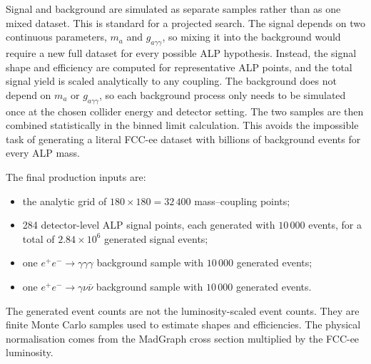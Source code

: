 \documentclass[12pt,a4paper]{article}
\newcommand{\gagg}{g_{a\gamma\gamma}}
\begin{document}
Signal and background are simulated as separate samples rather than as one
mixed dataset. This is standard for a projected search. The signal depends on
two continuous parameters, $m_a$ and $\gagg$, so mixing it into the background
would require a new full dataset for every possible ALP hypothesis. Instead,
the signal shape and efficiency are computed for representative ALP points,
and the total signal yield is scaled analytically to any coupling. The
background does not depend on $m_a$ or $\gagg$, so each background process only
needs to be simulated once at the chosen collider energy and detector setting.
The two samples are then combined statistically in the binned limit calculation.
This avoids the impossible task of generating a literal FCC-ee dataset with
billions of background events for every ALP mass.

The final production inputs are:
\begin{itemize}
    \item the analytic grid of $180\times180=32\,400$ mass--coupling points;
    \item 284 detector-level ALP signal points, each generated with
    $10\,000$ events, for a total of $2.84\times10^6$ generated signal events;
    \item one $e^+e^-\to\gamma\gamma\gamma$ background sample with
    $10\,000$ generated events;
    \item one $e^+e^-\to\gamma\nu\bar{\nu}$ background sample with
    $10\,000$ generated events.
\end{itemize}
The generated event counts are not the luminosity-scaled event counts.
They are finite Monte Carlo samples used to estimate shapes and efficiencies.
The physical normalisation comes from the MadGraph cross section multiplied by
the FCC-ee luminosity.
\end{document}
